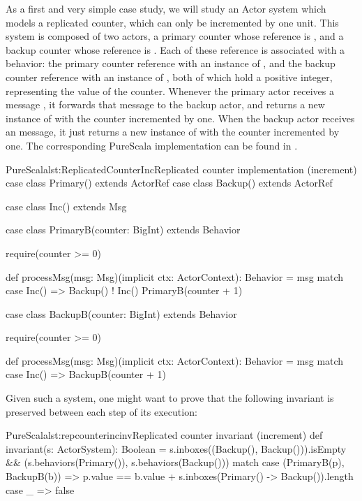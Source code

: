 As a first and very simple case study, we will study an Actor system which models a
replicated counter, which can only be incremented by one unit. This system is 
composed of two actors, a primary counter whose reference is ,
and a backup counter whose reference is .
Each of these reference is associated with a behavior: the primary counter reference with
an instance of , and the backup counter reference with an instance 
of , both of which hold a positive integer, representing the value of the
counter. Whenever the primary actor receives a message , it forwards that
message to the backup actor, and returns a new instance of  with the
counter incremented by one. When the backup actor receives an  message,
it just returns a new instance of  with the counter incremented by one. 
The corresponding PureScala implementation can be found
in .

\begin{Code}{PureScala}{lst:ReplicatedCounterInc}{Replicated counter implementation (increment)}
case class Primary() extends ActorRef
case class Backup()  extends ActorRef

case class Inc() extends Msg

case class PrimaryB(counter: BigInt) extends Behavior {
  require(counter >= 0)

  def processMsg(msg: Msg)(implicit ctx: ActorContext): Behavior = msg match {
    case Inc() =>
      Backup() ! Inc()
      PrimaryB(counter + 1)
  }
}

case class BackupB(counter: BigInt) extends Behavior {
  require(counter >= 0)

  def processMsg(msg: Msg)(implicit ctx: ActorContext): Behavior = msg match {
    case Inc() => BackupB(counter + 1)
  }
}
\end{Code}

Given such a system, one might want to prove that the following invariant is 
preserved between each step of its execution:

\begin{Code}{PureScala}{lst:repcounterincinv}{Replicated counter invariant (increment)}
def invariant(s: ActorSystem): Boolean = {
  s.inboxes((Backup(), Backup())).isEmpty && {
    (s.behaviors(Primary()), s.behaviors(Backup())) match {
      case (PrimaryB(p), BackupB(b)) =>
        p.value == b.value + s.inboxes(Primary() -> Backup()).length
      case _ => false
    }
  }
}
\end{Code}

